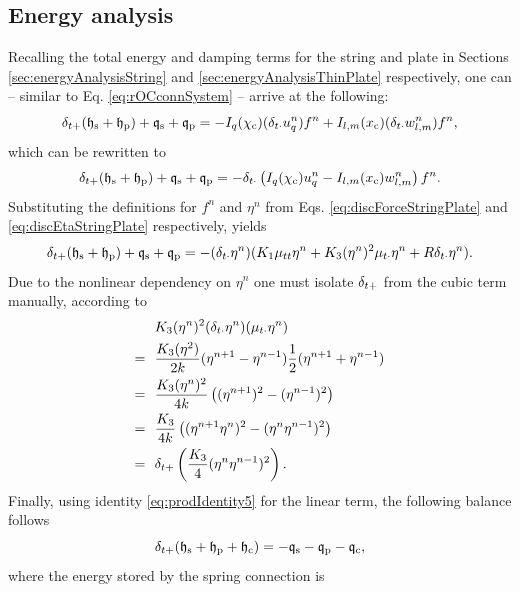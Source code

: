 \subsection{Energy analysis}
Recalling the total energy and damping terms for the string and plate in Sections \ref{sec:energyAnalysisString} and \ref{sec:energyAnalysisThinPlate} respectively, one can --  similar to Eq. \eqref{eq:rOCconnSystem} -- arrive at the following:
\begin{equation}
    \delta_{t+}(\mathfrak{h}_{\text{s}} + \mathfrak{h}_{\text{p}}) + \mathfrak{q}_{\text{s}} + \mathfrak{q}_{\text{p}} = -I_q(\chi_{\text{c}}) (\delta_{t\cdot} u_q^n)f^n +I_{l,m}(x_{\text{c}})(\delta_{t\cdot} w_{l,m}^n)f^n,
\end{equation}
which can be rewritten to
\begin{equation*}
    \delta_{t+}(\mathfrak{h}_{\text{s}} + \mathfrak{h}_{\text{p}}) + \mathfrak{q}_{\text{s}} + \mathfrak{q}_{\text{p}} = -\delta_{t\cdot} \left(I_q(\chi_{\text{c}}) u_q^n - I_{l,m}(x_{\text{c}})w_{l,m}^n\right)f^n.
\end{equation*}
Substituting the definitions for $f^n$ and $\eta^n$ from Eqs. \eqref{eq:discForceStringPlate} and \eqref{eq:discEtaStringPlate} respectively, yields
\begin{equation*}
    \delta_{t+}(\mathfrak{h}_{\text{s}} + \mathfrak{h}_{\text{p}}) + \mathfrak{q}_{\text{s}} + \mathfrak{q}_{\text{p}} = -(\delta_{t\cdot}\eta^n)(K_1\mu_{tt}\eta^n+K_3(\eta^n)^2\mu_{t\cdot}\eta^n+R\delta_{t\cdot}\eta^n).
\end{equation*}
Due to the nonlinear dependency on $\eta^n$ one must isolate $\delta_{t+}$ from the cubic term manually, according to
\begin{align*}
    &\ \ K_3(\eta^n)^2(\delta_{t\cdot} \eta^n)(\mu_{t\cdot} \eta^n)\\
    = &\ \ \frac{K_3(\eta^2)}{2k}(\eta^{n+1} - \eta^{n-1})\frac{1}{2}(\eta^{n+1} + \eta^{n-1})\\
    = &\ \ \frac{K_3(\eta^n)^2}{4k}\left((\eta^{n+1})^2 - (\eta^{n-1})^2\right)\\
    = &\ \ \frac{K_3}{4k}\left((\eta^{n+1}\eta^n)^2 - (\eta^n\eta^{n-1})^2\right)\\
    = &\ \ \delta_{t+}\left(\frac{K_3}{4}(\eta^n\eta^{n-1})^2\right).
\end{align*}
Finally, using identity \eqref{eq:prodIdentity5} for the linear term, the following balance follows
\begin{equation}
    \delta_{t+}(\mathfrak{h}_{\text{s}} + \mathfrak{h}_{\text{p}} + \mathfrak{h}_{\text{c}}) = - \mathfrak{q}_{\text{s}} - \mathfrak{q}_{\text{p}} - \mathfrak{q}_{\text{c}},
\end{equation}
where the energy stored by the spring connection is
